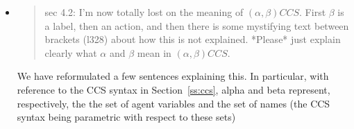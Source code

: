 \begin{itemize}



  \item \begin{quote}
sec 4.2: I'm now totally lost on the meaning of $(\alpha, \beta) CCS$. First $\beta$ is a label, then an action, and then there is some mystifying text between brackets (l328) about how this is not explained. *Please* just explain clearly what $\alpha$ and $\beta$ mean in $(\alpha, \beta) CCS$. 
\end{quote}
  \Mark We have reformulated a few sentences explaining this. 
In particular, with reference to 
the CCS syntax in Section~\ref{ss:ccs}, 
alpha and beta represent, respectively, the 
the set of agent variables 
and %
the
set of names (the CCS syntax being parametric with respect to these sets)







\end{itemize}
